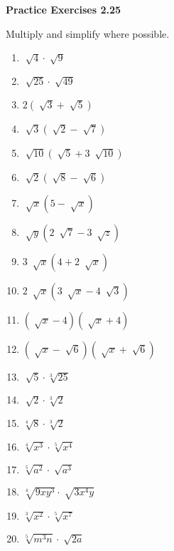 \vspace{0.3ex}
\noindent\textbf{Practice Exercises 2.25}

\vspace{0.2ex}

Multiply and simplify where possible.

\begin{multicols}{2}
\begin{enumerate}[noitemsep, label = \color{blue}\arabic*. ]
\item \(\sqrt[]{4} \cdot \sqrt[]{9}\)
\item \(\sqrt[]{25} \cdot \sqrt[]{49}\)
\item \(2 (\sqrt[]{3} + \sqrt[]{5})\)
\item \(\sqrt[]{3} (\sqrt[]{2} - \sqrt[]{7})\)
\item \(\sqrt[]{10} (\sqrt[]{5} + 3~\sqrt[]{10})\)
\item \(\sqrt[]{2} (\sqrt[]{8} - \sqrt[]{6})\)
\item \(\sqrt[]{x}(5 - \sqrt[]{x})\)
\item \(\sqrt[]{y}(2~\sqrt[]{7} - 3~\sqrt[]{z})\)
\item \(3~\sqrt[]{x}(4 + 2~\sqrt[]{x})\)
\item \(2~\sqrt[]{x}(3~\sqrt[]{x} - 4~\sqrt[]{3})\)
\item \(\left( \sqrt[]{x} - 4 \right)\left( \sqrt[]{x} + 4 \right)\)
\item \(\left( \sqrt[]{x} - \sqrt[]{6}\right)\left( \sqrt[]{x} + \sqrt[]{6} \right)\)
\item \(\sqrt[]{5} \cdot \sqrt[{\scriptstyle 3}]{25}\)
\item \(\sqrt[]{2} \cdot \sqrt[{\scriptstyle 3}]{2}\)
\item \(\sqrt[{\scriptstyle 4}]{8} \cdot \sqrt[{\scriptstyle 3}]{2}\)
\item \(\sqrt[{\scriptstyle 4}]{x^{3}} \cdot \sqrt[{\scriptstyle 5}]{x^{4}}\)
\item \(\sqrt[{\scriptstyle 5}]{a^{2}} \cdot \sqrt[]{a^{3}}\)
\item \(\sqrt[{\scriptstyle 4}]{9xy^{3}} \cdot \sqrt[]{3x^{4}y}\)
\item \(\sqrt[{\scriptstyle 3}]{x^{2}} \cdot \sqrt[{\scriptstyle 5}]{x^{7}}\)
\item \(\sqrt[{\scriptstyle 5}]{m^{3}n} \cdot \sqrt[]{2a}\)
\end{enumerate}
\end{multicols}
